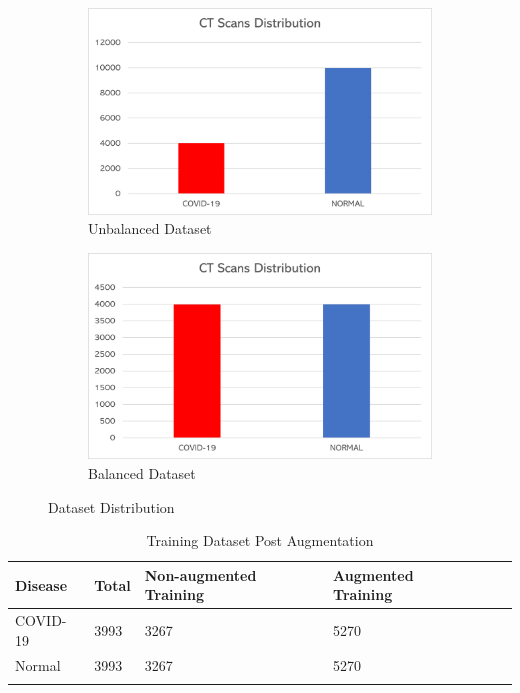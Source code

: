 \begin{figure}[H]
        \begin{subfigure}[b]{0.5\textwidth}
                \includegraphics[width=\linewidth]{Images/CTDistribution.png}
                \caption{Unbalanced Dataset}
                \label{fig:unbalanced}
        \end{subfigure}%
        \begin{subfigure}[b]{0.5\textwidth}
                \includegraphics[width=\linewidth]{Images/CTDistribution2.png}
                \caption{Balanced Dataset}
                \label{fig:balanced}
        \end{subfigure}%
        \caption{Dataset Distribution}\label{fig:CTdist}
\end{figure}

\begin{longtable}{| p{} | p{} | p{} | p{} | p{} | p{} |} 

    \hline
\textbf{Disease} & \textbf{Total}    & \textbf{Non-augmented Training}   &\textbf{Augmented Training} \\
\hline
			COVID-19    &3993   &3267    &5270
\\\hline
			Normal      &3993   &3267    &5270
\\\hline 

\caption{Training Dataset Post Augmentation}

  \label{tab:Dataset Info CT}
    \end{longtable}

